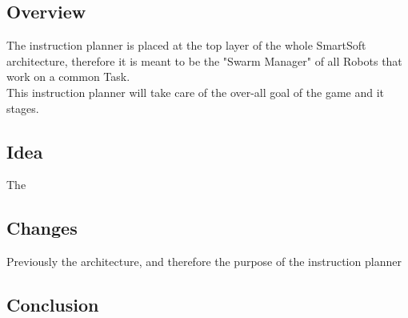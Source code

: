 

\subsection{Overview}
The instruction planner is placed at the top layer of the whole SmartSoft architecture,
therefore it is meant to be the "Swarm Manager" of all Robots that work on a common Task. \\

This instruction planner will take care of the over-all goal of the game and it
stages.
\subsection{Idea}
The
\subsection{Changes}
Previously the architecture, and therefore the purpose of the instruction planner 

\subsection{Conclusion}
